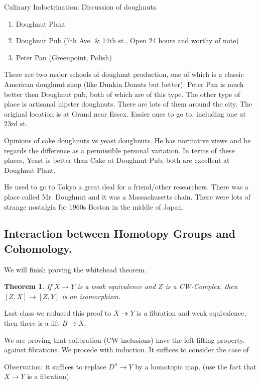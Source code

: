 \documentclass[10pt]{article}
\newtheorem{theorem}{Theorem}[section]
\theoremstyle{definition}
\begin{document}
Culinary Indoctrination:
Discussion of doughnuts. 
\begin{enumerate}
	\item Doughnut Plant
	\item Doughnut Pub (7th Ave. \& 14th st., Open 24 hours and worthy of note)
	\item Peter Pan (Greenpoint, Polish)
\end{enumerate}
There are two major schools of doughnut production, one of which is a classic American doughnut shop (like Dunkin Donuts but better). Peter Pan is much better then Doughnut pub, both of which are of this type. The other type of place is artisanal hipster doughnuts. There are lots of them around the city. The original location is at Grand near Essex. Easier ones to go to, including one at 23rd st.

Opinions of cake doughnuts vs yeast doughnuts. He has normative views and he regards the difference as a permissible personal variation. In terms of these places, Yeast is better than Cake at Doughnut Pub, both are excellent at Doughnut Plant.

He used to go to Tokyo a great deal for a friend/other researchers. There was a place called Mr. Doughnut and it was a Massachusetts chain. There were lots of strange nostalgia for 1960s Boston in the middle of Japan. 

\subsection{Interaction between Homotopy Groups and Cohomology.}
We will finish proving the whitehead theorem. 
\begin{theorem}
	If $X\to Y$ is a weak equivalence and $Z$ is a CW-Complex, then $[Z,X]\to [Z,Y]$ is an isomorphism. 
\end{theorem}
Last class we reduced this proof to $X\twoheadrightarrow Y$ is a fibration and weak equivalence, then there is a lift $B\to X$. \begin{center}
\end{center}
We are proving that cofibration (CW inclusions) have the left lifting property. against fibrations. We procede with induction. It suffices to consider the case of \begin{center}
\end{center}
Observation: it suffices to replace $D^n\to Y$ by a homotopic map.  (use the fact that $X\to Y$ is a fibration). 
\end{document}
